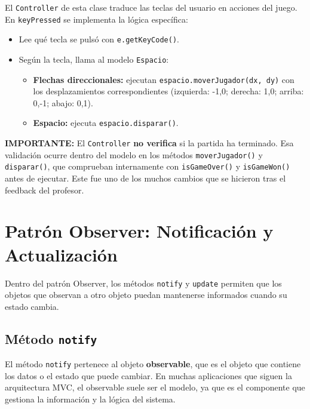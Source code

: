 \documentclass[12pt, a4paper]{article}
\begin{document}
El \texttt{Controller} de esta clase traduce las teclas del usuario en acciones del juego. En \texttt{keyPressed} se implementa la lógica específica:

\begin{itemize}[leftmargin=2em]
    \item Lee qué tecla se pulsó con \lstinline|e.getKeyCode()|.
    \item Según la tecla, llama al modelo \texttt{Espacio}:
    \begin{itemize}[leftmargin=2em]
        \item \textbf{Flechas direccionales:} ejecutan \lstinline|espacio.moverJugador(dx, dy)| con los desplazamientos correspondientes (izquierda: -1,0; derecha: 1,0; arriba: 0,-1; abajo: 0,1).
        \item \textbf{Espacio:} ejecuta \lstinline|espacio.disparar()|.
    \end{itemize}
\end{itemize}

\textbf{IMPORTANTE:}  El \texttt{Controller} \textbf{no verifica} si la partida ha terminado. Esa validación ocurre dentro del modelo en los métodos \texttt{moverJugador()} y \texttt{disparar()}, que comprueban internamente con \lstinline|isGameOver()| y \lstinline|isGameWon()| antes de ejecutar. Este fue uno de los muchos cambios que se hicieron tras el feedback del profesor.

\section{Patrón Observer: Notificación y Actualización}

Dentro del patrón Observer, los métodos \texttt{notify} y \texttt{update} permiten que los objetos que observan a otro objeto puedan mantenerse informados cuando su estado cambia.

\subsection{Método \texttt{notify}}

El método \texttt{notify} pertenece al objeto \textbf{observable}, que es el objeto que contiene los datos o el estado que puede cambiar. En muchas aplicaciones que siguen la arquitectura MVC, el observable suele ser el modelo, ya que es el componente que gestiona la información y la lógica del sistema.
\end{document}
